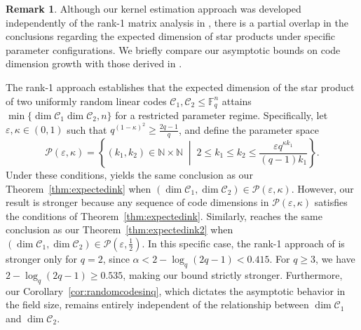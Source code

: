 \documentclass[a4paper,11pt,reqno]{article}
\newcommand{\F}{\mathbb{F}}
\newcommand{\C}{\mathcal{C}}
\theoremstyle{plain} \numberwithin{equation}{section}
\theoremstyle{definition}
\newtheorem{remark}[theorem]{Remark}
\begin{document}
{ 
\begin{remark}\label{remark:otherpaper}
    Although our kernel estimation approach was developed independently of the rank-1 matrix analysis in \cite{7282444}, there is a partial overlap in the conclusions regarding the expected dimension of star products under specific parameter configurations. We briefly compare our asymptotic bounds on code dimension growth with those derived in \cite{7282444}.

    The rank-1 approach establishes that the expected dimension of the star product of two uniformly random linear codes $\C_1,\C_2 \leq \F_q^n$ attains $\min\{\dim\C_1 \dim \C_2,n\}$ for a restricted parameter regime. Specifically, let $\varepsilon,\kappa\in(0,1)$ such that $q^{(1-\kappa)^2}\geq\frac{2q-1}{q}$, and define the parameter space
    \begin{equation}
        \mathcal{P}(\varepsilon,\kappa) = \left\{ (k_1,k_2) \in \mathbb{N}\times \mathbb{N} \;\middle|\; 2\leq k_1 \leq k_2 \leq \frac{\varepsilon q^{\kappa k_1}}{(q-1)k_1} \right\}. \label{eq:parameterspace}
    \end{equation}
    Under these conditions, \cite[Theorem 16]{7282444} yields the same conclusion as our Theorem~\ref{thm:expectedink} when $(\dim \C_1, \dim \C_2)\in \mathcal{P}(\varepsilon,\kappa)$. However, our result is stronger because any sequence of code dimensions in $\mathcal{P}(\varepsilon,\kappa)$ satisfies the conditions of Theorem~\ref{thm:expectedink}. Similarly, \cite[Theorem 17]{7282444} reaches the same conclusion as our Theorem~\ref{thm:expectedink2} when $(\dim \C_1, \dim \C_2)\in \mathcal{P}(\varepsilon,\frac{1}{2})$. In this specific case, the rank-1 approach of \cite{7282444} is stronger only for $q=2$, since $\alpha < 2 - \log_q(2q-1) < 0.415$. For $q\geq 3$, we have $2-\log_q(2q-1) \geq 0.535$, making our bound strictly stronger. Furthermore, our Corollary~\ref{cor:randomcodesinq}, which dictates the asymptotic behavior in the field size, remains entirely independent of the relationship between $\dim \C_1$ and $\dim \C_2$.
\end{remark}
}
\end{document}
